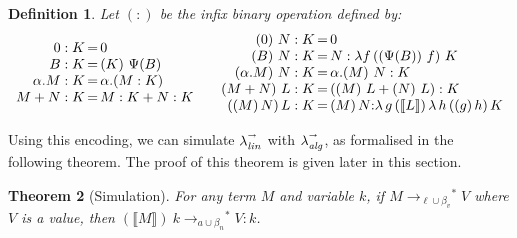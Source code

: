 \documentclass{LMCS}
\newtheorem{theorem}{Theorem}[section]
\newtheorem{definition}[theorem]{Definition}
\newcommand{\xllin}[1]{\ensuremath{\lambda^{\raisebox{0.5ex}{\textrm{\tiny $#1$}}}_{{\it lin}}}}
\newcommand{\xlalg}[1]{\ensuremath{\lambda^{\raisebox{0.5ex}{\textrm{\tiny $#1$}}}_{{\it alg}}}}
\newcommand{\llinred}{\xllin{\rightarrow}}
\newcommand{\lalgred}{\xlalg{\rightarrow}}
\newcommand{\xto}[1]{\ensuremath{\rightarrow_{#1}}}
\newcommand{\stoblinred}{\ensuremath{\xto{\ell\cup\beta_v}^{\ast}}}
\newcommand{\stobalgred}{\ensuremath{\xto{a\cup\beta_n}^{\ast}}}
\newcommand{\wt}[1]{\llbracket{#1}\rrbracket}
\begin{document}
\begin{definition}
  Let $(:)$ be
  the infix binary operation defined by:
  \[
    \begin{array}{r@{\,=\,}l}
      0:K&0\\
      B:K&(K)~\Psi(B)\\
      \alpha.M:K&\alpha.(M:K)\\
      M+N:K&M:K+N:K\\
    \end{array}~~~
    \begin{array}{r@{\,=\,}l}
      (0)~N:K&0\\
      (B)~N:K&N:\lambda f\,((\Psi(B))~f)~K\\
      (\alpha.M)~N:K&\alpha.(M)~N:K \\
      (M+N)~L:K&((M)~L+(N)~L):K \\
      ((M)\,N)\,L:K&(M)\,N{:}\lambda\,g\,(\wt{L})\,\lambda\,h\,((g)\,h)\,K \\
    \end{array}
  \]
\end{definition}

Using this encoding, we can simulate $\llinred$ with $\lalgred$, as
formalised in the following theorem. The proof of this theorem is given later in this section.

\begin{theorem}[Simulation]\label{th:sim}
  For any term $M$ and variable $k$,
  if $M\stoblinred V$ where $V$ is a value,
  then $(\wt M)~k \stobalgred V:k$.
\end{theorem}
\end{document}
